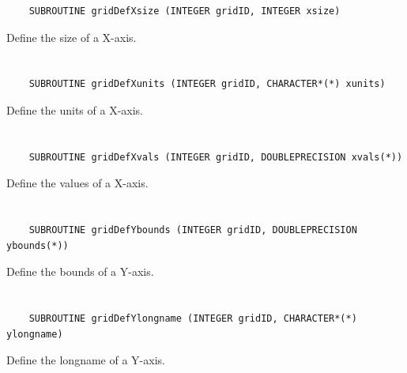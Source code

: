 \begin{verbatim}
    SUBROUTINE gridDefXsize (INTEGER gridID, INTEGER xsize)
\end{verbatim}

Define the size of a X-axis.


\section*{\tt {}}

\begin{verbatim}
    SUBROUTINE gridDefXunits (INTEGER gridID, CHARACTER*(*) xunits)
\end{verbatim}

Define the units of a X-axis.


\section*{\tt {}}

\begin{verbatim}
    SUBROUTINE gridDefXvals (INTEGER gridID, DOUBLEPRECISION xvals(*))
\end{verbatim}

Define the values of a X-axis.


\section*{\tt {}}

\begin{verbatim}
    SUBROUTINE gridDefYbounds (INTEGER gridID, DOUBLEPRECISION ybounds(*))
\end{verbatim}

Define the bounds of a Y-axis.


\section*{\tt {}}

\begin{verbatim}
    SUBROUTINE gridDefYlongname (INTEGER gridID, CHARACTER*(*) ylongname)
\end{verbatim}

Define the longname of a Y-axis.


\section*{\tt {}}

